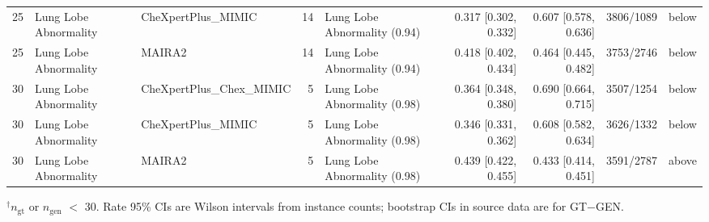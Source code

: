 \begin{table}[t]
\begin{tabular}{lllrlrrll}
25 & Lung Lobe Abnormality & CheXpertPlus\_MIMIC & 14 & Lung Lobe Abnormality (0.94) & 0.317 [0.302, 0.332] & 0.607 [0.578, 0.636] & 3806/1089 & below \\
25 & Lung Lobe Abnormality & MAIRA2 & 14 & Lung Lobe Abnormality (0.94) & 0.418 [0.402, 0.434] & 0.464 [0.445, 0.482] & 3753/2746 & below \\
30 & Lung Lobe Abnormality & CheXpertPlus\_Chex\_MIMIC & 5 & Lung Lobe Abnormality (0.98) & 0.364 [0.348, 0.380] & 0.690 [0.664, 0.715] & 3507/1254 & below \\
30 & Lung Lobe Abnormality & CheXpertPlus\_MIMIC & 5 & Lung Lobe Abnormality (0.98) & 0.346 [0.331, 0.362] & 0.608 [0.582, 0.634] & 3626/1332 & below \\
30 & Lung Lobe Abnormality & MAIRA2 & 5 & Lung Lobe Abnormality (0.98) & 0.439 [0.422, 0.455] & 0.433 [0.414, 0.451] & 3591/2787 & above \\
\bottomrule
\end{tabular}
\begin{flushleft}\footnotesize $^\dagger$$n_{\mathrm{gt}}$ or $n_{\mathrm{gen}}$ $<$ 30. Rate 95\% CIs are Wilson intervals from instance counts; bootstrap CIs in source data are for GT$-$GEN.
\end{flushleft}
\end{table}